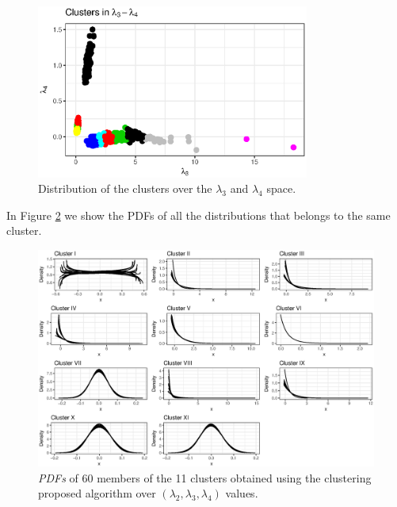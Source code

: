 \begin{figure}[H]
    \centering
    \includegraphics[width=0.8\textwidth]{img/gld_clustering/datasetI/l3l4/l3_l4.eps}
    \caption{Distribution of the clusters over the $\lambda_{3}$ and $\lambda_{4}$ space.}
    \label{fig:dataset1_l3l4_l3_l4}
\end{figure}



In Figure \ref{fig:dataset1_l3l4_cl1} we show the PDFs of all the distributions that belongs to the same cluster.

\begin{figure}[ht]
    \centering
    \includegraphics[width=\textwidth]{img/gld_clustering/datasetI/l3l4/clusters.eps}
    \caption{\textit{PDFs} of 60 members of the 11 clusters obtained using the clustering  proposed algorithm over $(\lambda_{2}, \lambda_{3}, \lambda_{4})$ values.}
    \label{fig:dataset1_l3l4_cl1}
\end{figure}

